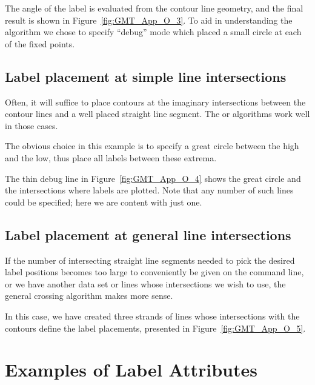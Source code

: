 

The angle of the label is evaluated from the contour line geometry, and the final result
is shown in Figure~\ref{fig:GMT_App_O_3}.
To aid in understanding the algorithm we chose to specify ``debug'' mode which placed a
small circle at each of the fixed points.

\subsection{Label placement at simple line intersections}

Often, it will suffice to place contours at the imaginary intersections between the
contour lines and a well placed straight line segment.  The  or 
algorithms work well in those cases.



The obvious choice in this example is to specify a great circle between the high and
the low, thus place all labels between these extrema.

The thin debug line in Figure~\ref{fig:GMT_App_O_4} shows the great circle and the
intersections where labels are plotted.  Note that any number of such lines could be specified;
here we are content with just one.

\subsection{Label placement at general line intersections}

If the number of intersecting straight line segments needed to pick the desired label
positions becomes too large to conveniently be given on the command line, or we have
another data set or lines whose intersections we wish to use, the general crossing
algorithm makes more sense.



In this case, we have created three strands of lines whose intersections with the contours
define the label placements, presented in Figure~\ref{fig:GMT_App_O_5}.

\section{Examples of Label Attributes}


